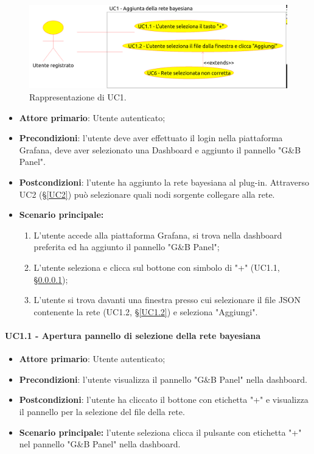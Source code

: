 \begin{figure}[H]
	\begin{center}
		\includegraphics[scale=0.5]{./images/UC1.png}
		 \caption{Rappresentazione di UC1.}	
	\end{center}
\end{figure}
\begin{itemize}
	\item \textbf{Attore primario}: Utente autenticato;
	\item \textbf{Precondizioni}: l'utente deve aver effettuato il login nella piattaforma Grafana, deve aver selezionato una Dashboard e aggiunto il pannello "G\&B Panel".
	\item \textbf{Postcondizioni}: l'utente ha aggiunto la rete bayesiana al plug-in. Attraverso UC2 (§\ref{UC2}) può selezionare quali nodi sorgente collegare alla rete.
	\item \textbf{Scenario principale:}
	\begin{enumerate}
		\item L'utente accede alla piattaforma Grafana, si trova nella dashboard preferita ed ha aggiunto il pannello "G\&B Panel";
		\item L'utente seleziona e clicca sul bottone con simbolo di "+" (UC1.1, §\ref{UC1.1});
		\item L'utente si trova davanti una finestra presso cui selezionare il file JSON contenente la rete (UC1.2, §\ref{UC1.2}) e seleziona "Aggiungi".
	\end{enumerate}
\end{itemize}

\paragraph{UC1.1 - Apertura pannello di selezione della rete bayesiana}\label{UC1.1}
\begin{itemize}
	\item \textbf{Attore primario}: Utente autenticato; 
	\item \textbf{Precondizioni}: l'utente visualizza il pannello "G\&B Panel" nella dashboard.
	\item \textbf{Postcondizioni}: l'utente ha cliccato il bottone con etichetta "+" e visualizza il pannello per la selezione del file della rete.
	\item \textbf{Scenario principale:} l'utente seleziona clicca il pulsante con etichetta "+" nel pannello "G\&B Panel" nella dashboard.
\end{itemize}


